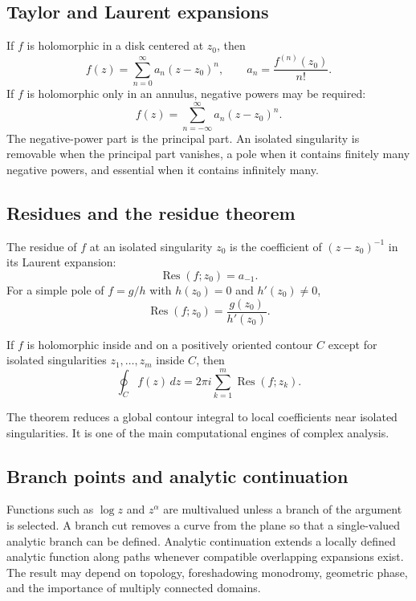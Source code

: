 \subsection{Taylor and Laurent expansions}
If $f$ is holomorphic in a disk centered at $z_0$, then
\[
f(z)=\sum_{n=0}^{\infty}a_n(z-z_0)^n,
\qquad a_n=\frac{f^{(n)}(z_0)}{n!}.
\]
If $f$ is holomorphic only in an annulus, negative powers may be required:
\[
f(z)=\sum_{n=-\infty}^{\infty}a_n(z-z_0)^n.
\]
The negative-power part is the principal part. An isolated singularity is removable when the principal part vanishes, a pole when it contains finitely many negative powers, and essential when it contains infinitely many.

\subsection{Residues and the residue theorem}
The residue of $f$ at an isolated singularity $z_0$ is the coefficient of $(z-z_0)^{-1}$ in its Laurent expansion:
\[
\operatorname{Res}(f;z_0)=a_{-1}.
\]
For a simple pole of $f=g/h$ with $h(z_0)=0$ and $h'(z_0)\neq0$,
\[
\operatorname{Res}(f;z_0)=\frac{g(z_0)}{h'(z_0)}.
\]

\begin{keyidea}
If $f$ is holomorphic inside and on a positively oriented contour $C$ except for isolated singularities $z_1,\ldots,z_m$ inside $C$, then
\[
\boxed{\oint_C f(z)\,dz=2\pi i\sum_{k=1}^{m}\operatorname{Res}(f;z_k).}
\]
\end{keyidea}

The theorem reduces a global contour integral to local coefficients near isolated singularities. It is one of the main computational engines of complex analysis.

\subsection{Branch points and analytic continuation}
Functions such as $\log z$ and $z^\alpha$ are multivalued unless a branch of the argument is selected. A branch cut removes a curve from the plane so that a single-valued analytic branch can be defined. Analytic continuation extends a locally defined analytic function along paths whenever compatible overlapping expansions exist. The result may depend on topology, foreshadowing monodromy, geometric phase, and the importance of multiply connected domains.
